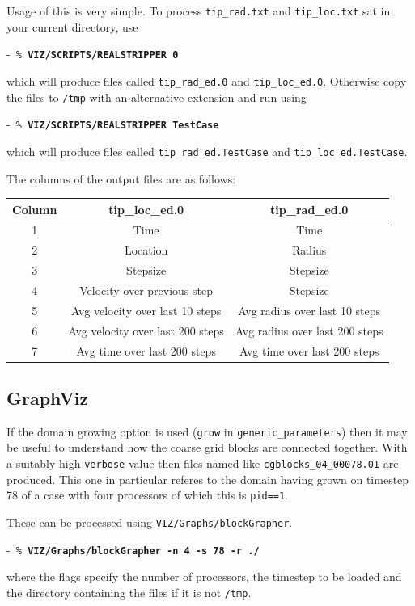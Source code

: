 \documentclass[paper=a4, fontsize=11pt,twoside,bibtotoc]{scrartcl}		%
\newenvironment{codebox}{\begin{center}\begin{MakeFramed}{\hsize0.99\linewidth\advance\hsize-\width\FrameRestore}\tt}{\end{MakeFramed}\end{center}}
\newcommand{\prompt}[1]{\textsl{\%} \textbf{#1}}
\begin{document}
Usage of this is very simple.  To process \texttt{tip\_rad.txt} and \texttt{tip\_loc.txt} sat in your current directory, use
\begin{codebox}
	\prompt{VIZ/SCRIPTS/REALSTRIPPER 0}
\end{codebox}
which will produce files called \texttt{tip\_rad\_ed.0} and \texttt{tip\_loc\_ed.0}.  
Otherwise copy the files to \texttt{/tmp} with an alternative extension and run using
\begin{codebox}
	\prompt{VIZ/SCRIPTS/REALSTRIPPER TestCase}
\end{codebox}
which will produce files called	\texttt{tip\_rad\_ed.TestCase} and \texttt{tip\_loc\_ed.TestCase}.

The columns of the output files are as follows:
\begin{center}
	\begin{tabular}{ccc}
		\hline
		Column	& tip\_loc\_ed.0	& tip\_rad\_ed.0\\
		\hline
		1	&Time		&Time	\\
		2	&Location	&Radius	\\
		3	&Stepsize	&Stepsize	\\
		4	&Velocity over previous step	&Stepsize	\\
		5	&Avg velocity  over last 10 steps	&Avg radius over last 10 steps	\\
		6	&Avg velocity  over last 200 steps	&Avg radius over last 200 steps	\\
		7	&Avg time over last 200 steps	& Avg time over last 200 steps	\\
		\hline
	\end{tabular}
\end{center}


\subsection{GraphViz}

If the domain growing option is used (\texttt{grow} in \texttt{generic\_parameters}) then it may be useful to understand how the coarse grid blocks are connected 
together.  With a suitably high \texttt{verbose} value then files named like \texttt{cgblocks\_04\_00078.01} are produced.  This one in particular referes to the 
domain having grown on timestep 78 of a case with four processors of which this is \texttt{pid==1}.

These can be processed using \texttt{VIZ/Graphs/blockGrapher}.  
\begin{codebox}
	\prompt{VIZ/Graphs/blockGrapher -n 4 -s 78 -r ./}
\end{codebox}
where the flags specify the number of processors, the timestep to be loaded and the directory containing the files if it is not \texttt{/tmp}.
\end{document}
